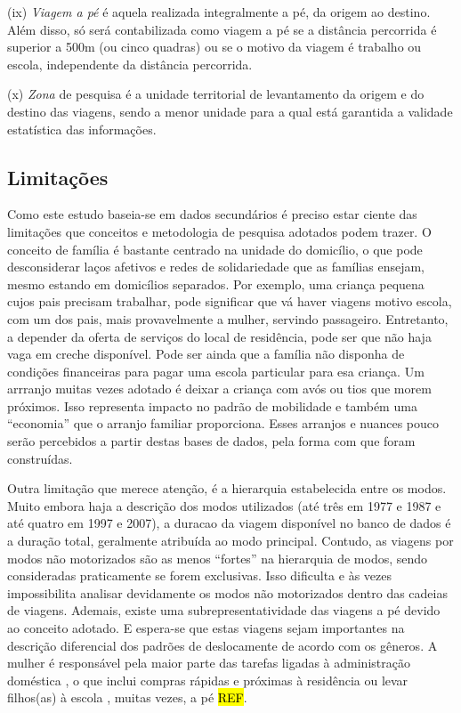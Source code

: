 \begin{compactitem}[]
\item (ix) \emph{Viagem a pé} é aquela realizada integralmente a pé, da origem ao destino. Além disso, só será contabilizada como viagem a pé se a distância percorrida é superior a 500m (ou cinco quadras) ou se o motivo da viagem é trabalho ou escola, independente da distância percorrida.

\item (x) \emph{Zona} de pesquisa é a unidade territorial de levantamento da origem e do destino das viagens, sendo a menor unidade para a qual está garantida a validade estatística das informações.
\end{compactitem}

\subsection{Limitações}\label{subsec:limitacoes}

Como este estudo baseia-se em dados secundários é preciso estar ciente das limitações que conceitos e metodologia de pesquisa adotados podem trazer. O conceito de família é bastante centrado na unidade do domicílio, o que pode desconsiderar laços afetivos e redes de solidariedade que as famílias ensejam, mesmo estando em domicílios separados. Por exemplo, uma criança pequena cujos pais precisam trabalhar, pode significar que vá haver viagens motivo escola, com um dos pais, mais provavelmente a mulher, servindo passageiro. Entretanto, a depender da oferta de serviços do local de residência, pode ser que não haja vaga em creche disponível. Pode ser ainda que a família não disponha de  condições financeiras para pagar uma escola particular para esa criança. Um arrranjo muitas vezes adotado é deixar a criança com avós ou tios que morem próximos. Isso representa impacto no padrão de mobilidade e também uma ``economia'' que o arranjo familiar proporciona. Esses arranjos e nuances pouco serão percebidos a partir destas bases de dados, pela forma com que foram construídas.

Outra limitação que merece atenção, é a hierarquia estabelecida entre os modos. Muito embora haja a descrição dos modos utilizados (até três em 1977 e 1987 e até quatro em 1997 e 2007), a duracao da viagem disponível no banco de dados é a duração total, geralmente atribuída ao modo principal. Contudo, as viagens por modos não motorizados são as menos ``fortes'' na hierarquia de modos, sendo consideradas praticamente se forem exclusivas. Isso dificulta e às vezes impossibilita analisar devidamente os modos não motorizados dentro das cadeias de viagens. 
Ademais, existe uma subrepresentatividade das viagens a pé devido ao conceito adotado. E espera-se que estas viagens sejam importantes na descrição diferencial dos padrões de deslocamente de acordo com os gêneros. A mulher é responsável pela maior parte das tarefas ligadas à administração doméstica \cite{ROOT1999,VANCE2007}, o que inclui compras rápidas e próximas à residência ou levar filhos(as) à escola \cite{FOX1983,FAGNANI1983,IBIPO1992,MCNUCKIN2005,SCHWANEN2002,SONG2003,CRANE2007}, muitas vezes, a pé \hl{REF}.



